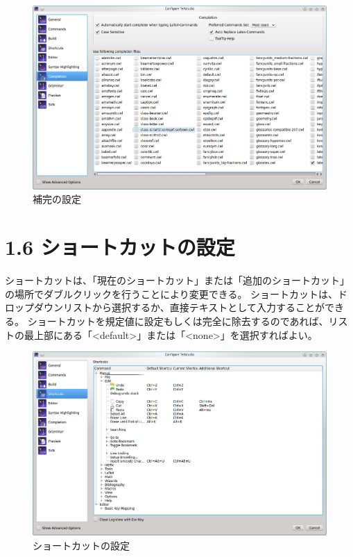 \documentclass[]{book}
\makeatletter
\def\maxwidth{\ifdim\Gin@nat@width>\linewidth\linewidth
\else\Gin@nat@width\fi}
\let\Oldincludegraphics\includegraphics
\renewcommand{\includegraphics}[1]{\Oldincludegraphics[width=\maxwidth]{#1}}
\makeatother
\begin{document}
\begin{figure}[htbp]
\centering
\includegraphics{configure_completion.png}
\caption{補完の設定}
\end{figure}

\section{1.6 ショートカットの設定}

ショートカットは、「現在のショートカット」または「追加のショートカット」の場所でダブルクリックを行うことにより変更できる。
ショートカットは、ドロップダウンリストから選択するか、直接テキストとして入力することができる。
ショートカットを規定値に設定もしくは完全に除去するのであれば、リストの最上部にある「\textless{}default\textgreater{}」または「\textless{}none\textgreater{}」を選択すればよい。

\begin{figure}[htbp]
\centering
\includegraphics{configure_shortcuts.png}
\caption{ショートカットの設定}
\end{figure}
\end{document}

